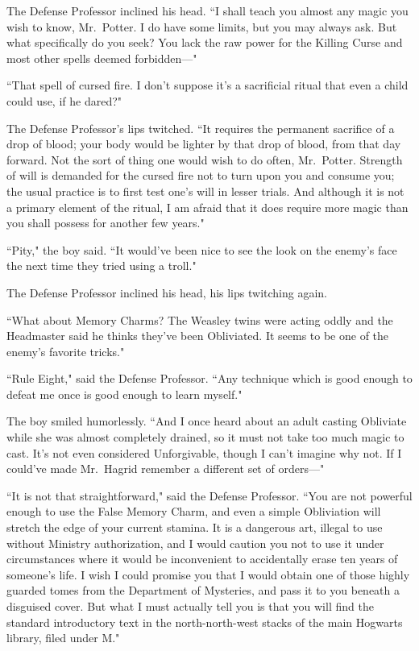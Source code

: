 The Defense Professor inclined his head. ``I shall teach you almost any magic you wish to know, Mr.~Potter. I do have some limits, but you may always ask. But what specifically do you seek? You lack the raw power for the Killing Curse and most other spells deemed forbidden—"

``That spell of cursed fire. I don't suppose it's a sacrificial ritual that even a child could use, if he dared?"

The Defense Professor's lips twitched. ``It requires the permanent sacrifice of a drop of blood; your body would be lighter by that drop of blood, from that day forward. Not the sort of thing one would wish to do often, Mr.~Potter. Strength of will is demanded for the cursed fire not to turn upon you and consume you; the usual practice is to first test one's will in lesser trials. And although it is not a primary element of the ritual, I am afraid that it does require more magic than you shall possess for another few years."

``Pity," the boy said. ``It would've been nice to see the look on the enemy's face the next time they tried using a troll."

The Defense Professor inclined his head, his lips twitching again.

``What about Memory Charms? The Weasley twins were acting oddly and the Headmaster said he thinks they've been Obliviated. It seems to be one of the enemy's favorite tricks."

``Rule Eight," said the Defense Professor. ``Any technique which is good enough to defeat me once is good enough to learn myself."

The boy smiled humorlessly. ``And I once heard about an adult casting Obliviate while she was almost completely drained, so it must not take too much magic to cast. It's not even considered Unforgivable, though I can't imagine why not. If I could've made Mr.~Hagrid remember a different set of orders—"

``It is not that straightforward," said the Defense Professor. ``You are not powerful enough to use the False Memory Charm, and even a simple Obliviation will stretch the edge of your current stamina. It is a dangerous art, illegal to use without Ministry authorization, and I would caution you not to use it under circumstances where it would be inconvenient to accidentally erase ten years of someone's life. I wish I could promise you that I would obtain one of those highly guarded tomes from the Department of Mysteries, and pass it to you beneath a disguised cover. But what I must actually tell you is that you will find the standard introductory text in the north-north-west stacks of the main Hogwarts library, filed under M."

